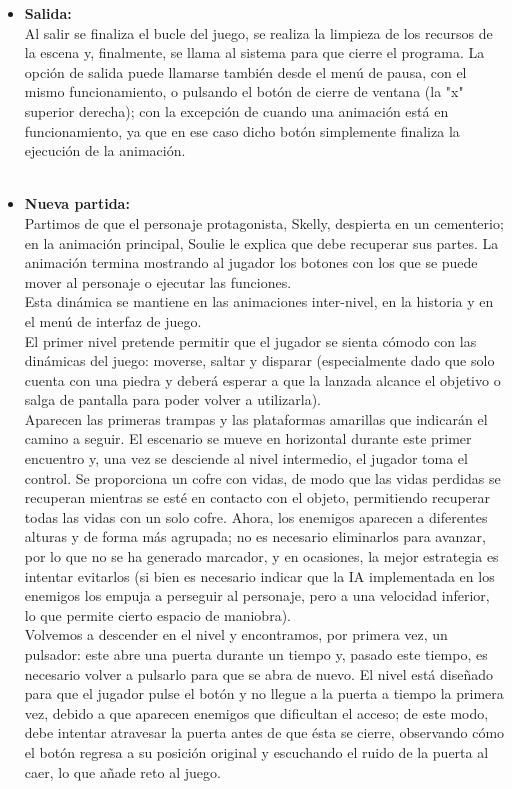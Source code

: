 \documentclass[12pt,a4paper,twoside,spanish]{article}      %
\begin{document}
\begin{itemize}
    \item \textbf{Salida:}\\[1mm]
    Al salir se finaliza el bucle del juego, se realiza la limpieza de los recursos de la escena y, finalmente, se llama al sistema para que cierre el programa. La opción de salida puede llamarse también desde el menú de pausa, con el mismo funcionamiento, o pulsando el botón de cierre de ventana (la "x" superior derecha); con la excepción de cuando una animación está en funcionamiento, ya que en ese caso dicho botón simplemente finaliza la ejecución de la animación.\\\\

    \item \textbf{Nueva partida:}\\[1mm]
    Partimos de que el personaje protagonista, Skelly, despierta en un cementerio; en la animación principal, Soulie le explica que debe recuperar sus partes. La animación termina mostrando al jugador los botones con los que se puede mover al personaje o ejecutar las funciones.\\[1mm]
    Esta dinámica se mantiene en las animaciones inter-nivel, en la historia y en el menú de interfaz de juego.\\[1mm]
    El primer nivel pretende permitir que el jugador se sienta cómodo con las dinámicas del juego: moverse, saltar y disparar (especialmente dado que solo cuenta con una piedra y deberá esperar a que la lanzada alcance el objetivo o salga de pantalla para poder volver a utilizarla).\\[1mm]
    Aparecen las primeras trampas y las plataformas amarillas que indicarán el camino a seguir. El escenario se mueve en horizontal durante este primer encuentro y, una vez se desciende al nivel intermedio, el jugador toma el control. Se proporciona un cofre con vidas, de modo que las vidas perdidas se recuperan mientras se esté en contacto con el objeto, permitiendo recuperar todas las vidas con un solo cofre. Ahora, los enemigos aparecen a diferentes alturas y de forma más agrupada; no es necesario eliminarlos para avanzar, por lo que no se ha generado marcador, y en ocasiones, la mejor estrategia es intentar evitarlos (si bien es necesario indicar que la IA implementada en los enemigos los empuja a perseguir al personaje, pero a una velocidad inferior, lo que permite cierto espacio de maniobra).\\[1mm]
    Volvemos a descender en el nivel y encontramos, por primera vez, un pulsador: este abre una puerta durante un tiempo y, pasado este tiempo, es necesario volver a pulsarlo para que se abra de nuevo. El nivel está diseñado para que el jugador pulse el botón y no llegue a la puerta a tiempo la primera vez, debido a que aparecen enemigos que dificultan el acceso; de este modo, debe intentar atravesar la puerta antes de que ésta se cierre, observando cómo el botón regresa a su posición original y escuchando el ruido de la puerta al caer, lo que añade reto al juego.\\[1mm]

\end{itemize}
\end{document}
